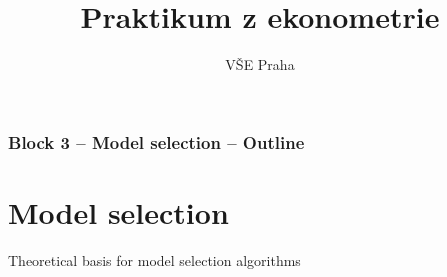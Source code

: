 \documentclass{beamer}
\title[Block 3]{Praktikum z ekonometrie} %
\author{VŠE Praha} %
\institute[4EK417] %
{
\medskip
\textit{Tomáš Formánek} %
}
\date{} %
\begin{document}
\begin{frame}
\titlepage %
\end{frame}

\begin{frame}
\frametitle{Block 3 -- Model selection -- Outline} %
\tableofcontents %
\end{frame}

\section{Model selection}
\begin{frame}{Theoretical basis for model selection algorithms}

\end{frame}
\end{document}
